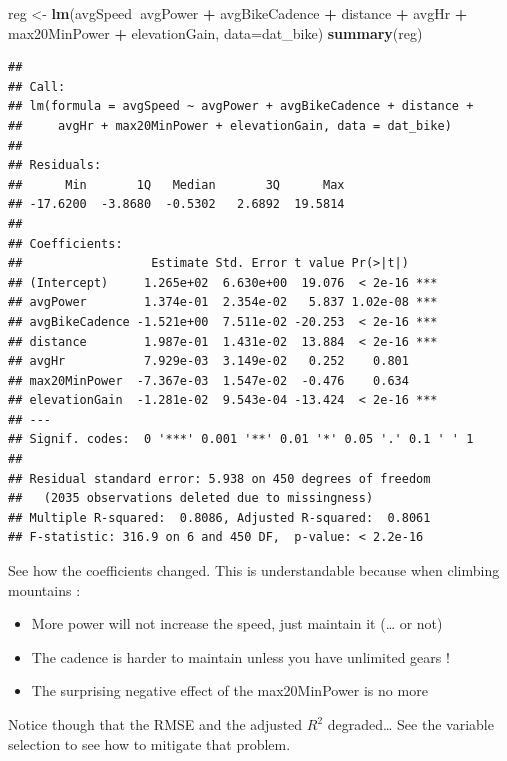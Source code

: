 \documentclass[
]{book}
\newenvironment{Shaded}{\begin{snugshade}}{\end{snugshade}}
\newcommand{\DataTypeTok}[1]{\textcolor[rgb]{0.13,0.29,0.53}{#1}}
\newcommand{\KeywordTok}[1]{\textcolor[rgb]{0.13,0.29,0.53}{\textbf{#1}}}
\newcommand{\NormalTok}[1]{#1}
\newcommand{\OperatorTok}[1]{\textcolor[rgb]{0.81,0.36,0.00}{\textbf{#1}}}
\newcommand{\StringTok}[1]{\textcolor[rgb]{0.31,0.60,0.02}{#1}}
\providecommand{\tightlist}{%
  \setlength{\itemsep}{0pt}\setlength{\parskip}{0pt}}
\begin{document}
\begin{Shaded}
\begin{Highlighting}[]
\NormalTok{reg <-}\StringTok{ }\KeywordTok{lm}\NormalTok{(avgSpeed}\OperatorTok{~}\NormalTok{avgPower }\OperatorTok{+}\StringTok{ }\NormalTok{avgBikeCadence }\OperatorTok{+}\StringTok{ }\NormalTok{distance }\OperatorTok{+}\StringTok{ }\NormalTok{avgHr }\OperatorTok{+}\StringTok{ }\NormalTok{max20MinPower }\OperatorTok{+}\StringTok{ }\NormalTok{elevationGain, }\DataTypeTok{data=}\NormalTok{dat_bike)}
\KeywordTok{summary}\NormalTok{(reg)}
\end{Highlighting}
\end{Shaded}

\begin{verbatim}
## 
## Call:
## lm(formula = avgSpeed ~ avgPower + avgBikeCadence + distance + 
##     avgHr + max20MinPower + elevationGain, data = dat_bike)
## 
## Residuals:
##      Min       1Q   Median       3Q      Max 
## -17.6200  -3.8680  -0.5302   2.6892  19.5814 
## 
## Coefficients:
##                  Estimate Std. Error t value Pr(>|t|)    
## (Intercept)     1.265e+02  6.630e+00  19.076  < 2e-16 ***
## avgPower        1.374e-01  2.354e-02   5.837 1.02e-08 ***
## avgBikeCadence -1.521e+00  7.511e-02 -20.253  < 2e-16 ***
## distance        1.987e-01  1.431e-02  13.884  < 2e-16 ***
## avgHr           7.929e-03  3.149e-02   0.252    0.801    
## max20MinPower  -7.367e-03  1.547e-02  -0.476    0.634    
## elevationGain  -1.281e-02  9.543e-04 -13.424  < 2e-16 ***
## ---
## Signif. codes:  0 '***' 0.001 '**' 0.01 '*' 0.05 '.' 0.1 ' ' 1
## 
## Residual standard error: 5.938 on 450 degrees of freedom
##   (2035 observations deleted due to missingness)
## Multiple R-squared:  0.8086,	Adjusted R-squared:  0.8061 
## F-statistic: 316.9 on 6 and 450 DF,  p-value: < 2.2e-16
\end{verbatim}

See how the coefficients changed. This is understandable because when climbing mountains :

\begin{itemize}
\tightlist
\item
  More power will not increase the speed, just maintain it (\ldots{} or not)
\item
  The cadence is harder to maintain unless you have unlimited gears !
\item
  The surprising negative effect of the max20MinPower is no more
\end{itemize}

Notice though that the RMSE and the adjusted \(R^2\) degraded\ldots{} See the variable selection to see how to mitigate that problem.
\end{document}
